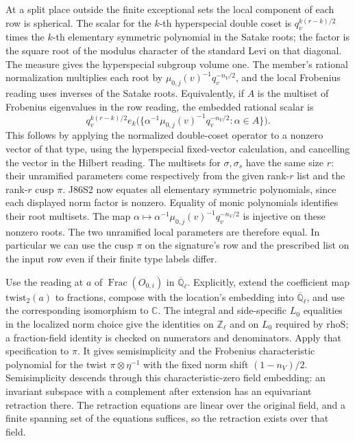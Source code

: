 At a split place outside the finite exceptional sets the local
component of each row is spherical. The scalar for the $k$-th
hyperspecial double coset is $q_v^{k(r-k)/2}$ times the $k$-th
elementary symmetric polynomial in the Satake roots; the factor is
the square root of the modulus character of the standard Levi on
that diagonal. The measure gives the hyperspecial subgroup volume
one. The member's rational normalization multiplies each root by
$\mu_{0,j}(v)^{-1}q_v^{-n_V/2}$, and the local Frobenius reading
uses inverses of the Satake roots. Equivalently, if $A$ is the
multiset of Frobenius eigenvalues in the row reading, the
embedded rational scalar is
\[
 q_v^{k(r-k)/2}e_k\bigl(\{\alpha^{-1}\mu_{0,j}(v)^{-1}
                         q_v^{-n_V/2}:\alpha\in A\}\bigr).
\]
This follows by applying the normalized double-coset operator to a
nonzero vector of that type, using the hyperspecial fixed-vector
calculation, and cancelling the vector in the Hilbert reading.
The multisets for $\sigma,\sigma_s$ have the same size $r$: their
unramified parameters come respectively from the given rank-$r$
list and the rank-$r$ cusp $\pi$. J86S2 now equates all elementary
symmetric polynomials, since each displayed norm factor is nonzero.
Equality of monic polynomials identifies their root multisets. The
map $\alpha\mapsto\alpha^{-1}\mu_{0,j}(v)^{-1}q_v^{-n_V/2}$ is
injective on these nonzero roots. The two unramified local parameters
are therefore equal. In particular we can use the cusp $\pi$ on
the signature's row and the prescribed list on the input row even if
their finite type labels differ.

Use the reading at $a$ of $\operatorname{Frac}(O_{0,i})$ in
$\overline{\mathbb Q}_\ell$. Explicitly, extend the coefficient
map $\mathrm{twist}_2(a)$ to fractions, compose with the location's
embedding into $\overline{\mathbb Q}_\ell$, and use the corresponding
isomorphism to $\mathbb C$. The integral and side-specific
$L_0$ equalities in the localized norm choice give the identities
on $\mathbb Z_\ell$ and on $L_0$ required by $\mathrm{rhoS}$;
a fraction-field identity is checked on numerators and denominators.
Apply that specification to $\pi$. It gives semisimplicity and the
Frobenius characteristic polynomial for the twist
$\pi\otimes\eta^{-1}$ with the fixed norm shift $(1-n_V)/2$.
Semisimplicity descends through this characteristic-zero field
embedding: an invariant subspace with a complement after extension
has an equivariant retraction there. The retraction equations are
linear over the original field, and a finite spanning set of the
equations suffices, so the retraction exists over that field.

